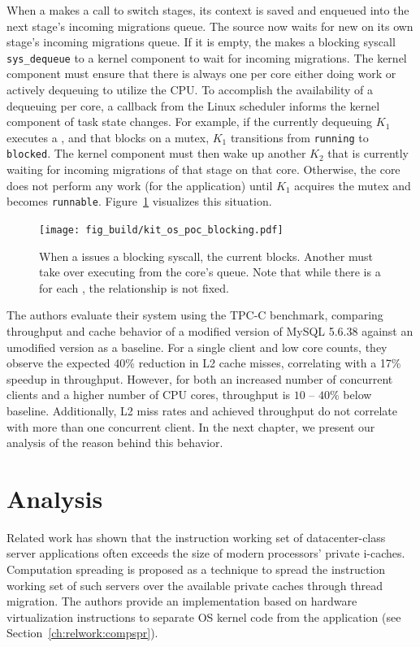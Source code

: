 \documentclass[12pt,a4paper]{book}
\begin{document}
When a \ult makes a call to switch stages, its context is saved and enqueued into the next stage's incoming migrations queue.
The source \klt now waits for new \ults on its own stage's incoming migrations queue.
If it is empty, the \klt makes a blocking syscall \texttt{sys\_dequeue} to a kernel component to wait for incoming migrations.
The kernel component must ensure that there is always one \klt per core either doing work or actively dequeuing \ults to utilize the CPU.
To accomplish the availability of a dequeuing \klt per core, a callback from the Linux scheduler informs the kernel component of task state changes.
For example, if the currently dequeuing \klt $K_1$ executes a \ult, and that \ult blocks on a mutex, $K_1$ transitions from \texttt{running} to \texttt{blocked}.
The kernel component must then wake up another \klt $K_2$ that is currently waiting for incoming migrations of that stage on that core.
Otherwise, the core does not perform any work (for the application) until $K_1$ acquires the mutex and becomes \texttt{runnable}.
Figure~\ref{fig:kit_os_poc_blocking} visualizes this situation.

\begin{figure}[h]
    \centering
    \texttt{[image: fig\_build/kit\_os\_poc\_blocking.pdf]}
    \caption{When a \ult issues a blocking syscall, the current \klt blocks. Another \klt must take over executing \ults from the core's queue. Note that while there is a \klt for each \ult, the relationship is not fixed.}
    \label{fig:kit_os_poc_blocking}
\end{figure}

The authors evaluate their system using the TPC-C benchmark, comparing throughput and cache behavior of a modified version of MySQL 5.6.38 against an umodified version as a baseline.
For a single client and low core counts, they observe the expected 40\% reduction in L2 cache misses, correlating with a 17\% speedup in throughput.
However, for both an increased number of concurrent clients and a higher number of CPU cores, throughput is ${10\text{~--~}40\%}$ below baseline.
Additionally, L2 miss rates and achieved throughput do not correlate with more than one concurrent client.
In the next chapter, we present our analysis of the reason behind this behavior.

\chapter{Analysis}\label{ch:analysis}
Related work has shown that the instruction working set of datacenter-class server applications often exceeds the size of modern processors' private i-caches.
Computation spreading is proposed as a technique to spread the instruction working set of such servers over the available private caches through thread migration.
The authors provide an implementation based on hardware virtualization instructions to separate OS kernel code from the application (see Section~\ref{ch:relwork:compspr}).
\end{document}
